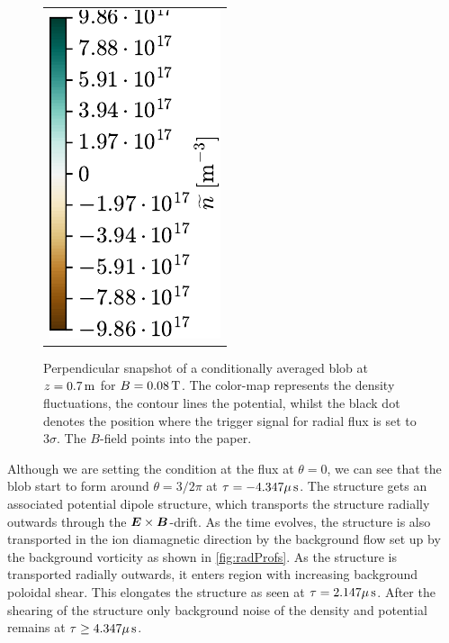 \begin{figure}[h!]
\begin{tabular}{ccc}
  \multicolumn{3}{c}{\hspace*{2cm}\includegraphics[angle=-90]{fig/results/blobs/matrix-perp-blobs-B0_0.08-fluct/colorbar}}
  \\
\end{tabular}
\caption{Perpendicular snapshot of a conditionally averaged blob at $z=0.7\, \text{m}$ for $B=0.08\, \text{T}$.
    The color-map represents the density fluctuations, the contour lines the potential, whilst the black dot denotes the position where the trigger signal for radial flux is set to $3\sigma$.
    The $B$-field points into the paper.
}
\label{fig:perpBlob008}
\end{figure}
%
Although we are setting the condition at the flux at $\theta = 0$, we can see that the blob start to form around $\theta = 3/2 \pi$ at $\tau=-4.347\mu \, \text{s}$.
The structure gets an associated potential dipole structure, which transports the structure radially outwards through the $\boldsymbol{E}\times\boldsymbol{B}$-drift.
As the time evolves, the structure is also transported in the ion diamagnetic direction by the background flow set up by the background vorticity as shown in \cref{fig:radProfs}.
As the structure is transported radially outwards, it enters region with increasing background poloidal shear.
This elongates the structure as seen at $\tau=2.147\mu \, \text{s}$.
After the shearing of the structure only background noise of the density and potential remains at $\tau \geq4.347\mu \, \text{s}$.

